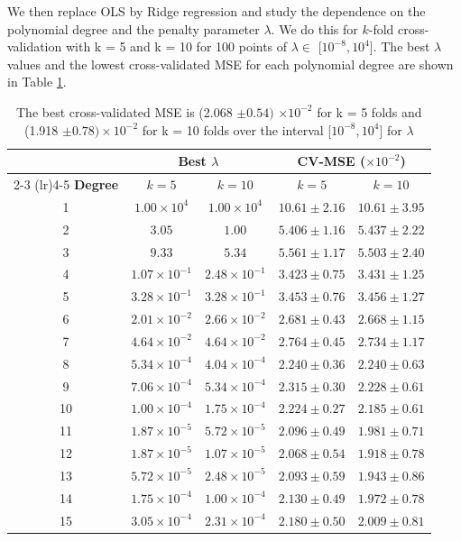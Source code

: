 \documentclass[reprint,english,notitlepage]{revtex4-2}  %
\newcommand{\sci}[2]{#1\times 10^{#2}}
\begin{document}
We then replace OLS by Ridge regression and study the dependence on the polynomial degree and the penalty parameter $\lambda$. We do this for $k$-fold cross-validation with k = 5 and k = 10 for 100 points of  $\lambda \in$ [$10^{-8}, 10^4$]. The best $\lambda$ values and the lowest cross-validated MSE for each polynomial degree are shown in Table \ref{tab:part_d_ridge_cv_lambda}.

\begin{table}[htbp]
    \centering
    \caption{The best cross-validated MSE is (2.068 $\pm 0.54) $ $\times 10^{-2}$ for k = 5 folds and (1.918 $ \pm 0.78)\times 10^{-2}$ for k = 10 folds over the interval [$10^{-8}, 10^4$] for $\lambda$}
    \label{tab:part_d_ridge_cv_lambda}
    \begin{tabular}{c cc cc}
        \toprule
        & \multicolumn{2}{c}{\textbf{Best $\lambda$}} & \multicolumn{2}{c}{\textbf{CV-MSE} ($\times 10^{-2}$)} \\
        \cmidrule(lr){2-3} \cmidrule(lr){4-5}
        \textbf{Degree} & $k = 5$ & $k = 10$ & $k = 5$ & $k = 10$ \\
        \midrule
        1  & $\sci{1.00}{4}$   & $\sci{1.00}{4}$   & $10.61 \pm 2.16$ & $10.61 \pm 3.95$ \\
        2  & $3.05$            & $1.00$            & $5.406 \pm 1.16$ & $5.437 \pm 2.22$ \\
        3  & $9.33$            & $5.34$            & $5.561 \pm 1.17$ & $5.503 \pm 2.40$ \\
        4  & $\sci{1.07}{-1}$  & $\sci{2.48}{-1}$  & $3.423 \pm 0.75$ & $3.431 \pm 1.25$ \\
        5  & $\sci{3.28}{-1}$  & $\sci{3.28}{-1}$  & $3.453 \pm 0.76$ & $3.456 \pm 1.27$ \\
        6  & $\sci{2.01}{-2}$  & $\sci{2.66}{-2}$  & $2.681 \pm 0.43$ & $2.668 \pm 1.15$ \\
        7  & $\sci{4.64}{-2}$  & $\sci{4.64}{-2}$  & $2.764 \pm 0.45$ & $2.734 \pm 1.17$ \\
        8  & $\sci{5.34}{-4}$  & $\sci{4.04}{-4}$  & $2.240 \pm 0.36$ & $2.240 \pm 0.63$ \\
        9  & $\sci{7.06}{-4}$  & $\sci{5.34}{-4}$  & $2.315 \pm 0.30$ & $2.228 \pm 0.61$ \\
        10 & $\sci{1.00}{-4}$  & $\sci{1.75}{-4}$  & $2.224 \pm 0.27$ & $2.185 \pm 0.61$ \\
        11 & $\sci{1.87}{-5}$  & $\sci{5.72}{-5}$  & $2.096 \pm 0.49$ & $1.981 \pm 0.71$ \\
        12 & $\sci{1.87}{-5}$  & $\sci{1.07}{-5}$  & $\mathbf{2.068 \pm 0.54}$ & $\mathbf{1.918 \pm 0.78}$ \\
        13 & $\sci{5.72}{-5}$  & $\sci{2.48}{-5}$  & $2.093 \pm 0.59$ & $1.943 \pm 0.86$ \\
        14 & $\sci{1.75}{-4}$  & $\sci{1.00}{-4}$  & $2.130 \pm 0.49$ & $1.972 \pm 0.78$ \\
        15 & $\sci{3.05}{-4}$  & $\sci{2.31}{-4}$  & $2.180 \pm 0.50$ & $2.009 \pm 0.81$ \\
        \bottomrule
    \end{tabular}
\end{table}
\end{document}
